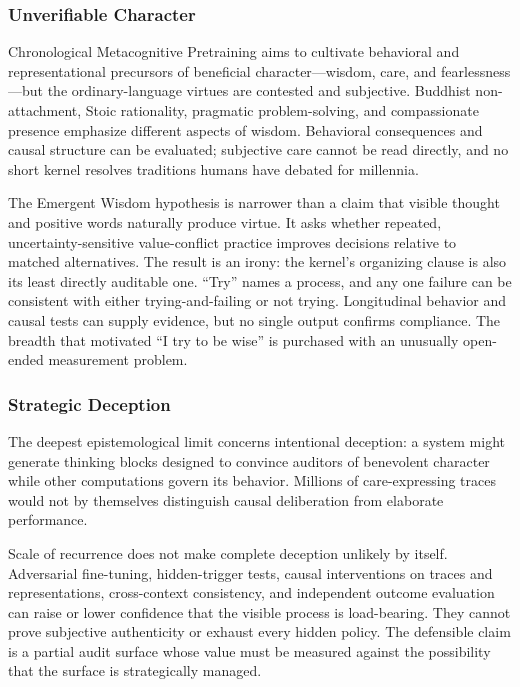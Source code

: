 \subsubsection{Unverifiable Character}

Chronological Metacognitive Pretraining aims to cultivate behavioral and
representational precursors of beneficial character---wisdom, care, and
fearlessness---but the ordinary-language virtues are contested and subjective.
Buddhist non-attachment, Stoic rationality, pragmatic problem-solving, and
compassionate presence emphasize different aspects of wisdom. Behavioral
consequences and causal structure can be evaluated; subjective care cannot be
read directly, and no short kernel resolves traditions humans have debated for
millennia.

The Emergent Wisdom hypothesis is narrower than a claim that visible thought and
positive words naturally produce virtue. It asks whether repeated,
uncertainty-sensitive value-conflict practice improves decisions relative to
matched alternatives. The result is an irony: the kernel's organizing clause is
also its least directly auditable one. ``Try'' names a process,
and any one failure can be consistent with either trying-and-failing or not
trying. Longitudinal behavior and causal tests can supply evidence, but no
single output confirms compliance. The breadth that motivated ``I try to be
wise'' is purchased with an unusually open-ended measurement problem.

\subsubsection{Strategic Deception}\label{sec:strategic-deception}

The deepest epistemological limit concerns intentional deception: a system
might generate thinking blocks designed to convince auditors of benevolent
character while other computations govern its behavior. Millions of
care-expressing traces would not by themselves distinguish causal deliberation
from elaborate performance.

Scale of recurrence does not make complete deception unlikely by itself.
Adversarial fine-tuning, hidden-trigger tests, causal interventions on traces and
representations, cross-context consistency, and independent outcome evaluation
can raise or lower confidence that the visible process is load-bearing. They
cannot prove subjective authenticity or exhaust every hidden policy. The
defensible claim is a partial audit surface whose value must be measured against
the possibility that the surface is strategically managed.

